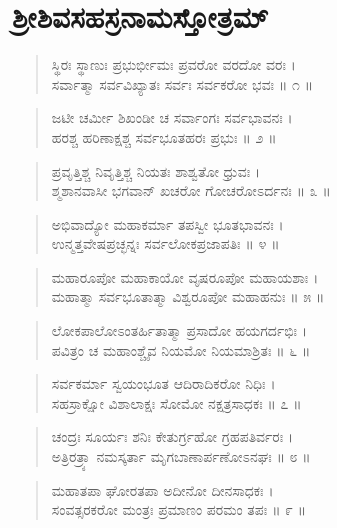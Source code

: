 
\chapter{ಶ್ರೀಶಿವಸಹಸ್ರನಾಮಸ್ತೋತ್ರಮ್}

\begin{verse}
ಸ್ಥಿರಃ ಸ್ಥಾಣುಃ ಪ್ರಭುರ್ಭೀಮಃ ಪ್ರವರೋ ವರದೋ ವರಃ ।\\ಸರ್ವಾತ್ಮಾ ಸರ್ವವಿಖ್ಯಾತಃ ಸರ್ವಃ ಸರ್ವಕರೋ ಭವಃ \num{॥ ೧ ॥}
\end{verse}

\begin{verse}
ಜಟೀ ಚರ್ಮೀ ಶಿಖಂಡೀ ಚ ಸರ್ವಾಂಗಃ ಸರ್ವಭಾವನಃ ।\\ಹರಶ್ಚ ಹರಿಣಾಕ್ಷಶ್ಚ ಸರ್ವಭೂತಹರಃ ಪ್ರಭುಃ \num{॥ ೨ ॥}
\end{verse}

\begin{verse}
ಪ್ರವೃತ್ತಿಶ್ಚ ನಿವೃತ್ತಿಶ್ಚ ನಿಯತಃ ಶಾಶ್ವತೋ ಧ್ರುವಃ ।\\ಶ್ಮಶಾನವಾಸೀ ಭಗವಾನ್ ಖಚರೋ ಗೋಚರೋಽರ್ದನಃ \num{॥ ೩ ॥}
\end{verse}

\begin{verse}
ಅಭಿವಾದ್ಯೋ ಮಹಾಕರ್ಮಾ ತಪಸ್ವೀ ಭೂತಭಾವನಃ ।\\ಉನ್ಮತ್ತವೇಷಪ್ರಚ್ಛನ್ನಃ ಸರ್ವಲೋಕಪ್ರಜಾಪತಿಃ \num{॥ ೪ ॥}
\end{verse}

\begin{verse}
ಮಹಾರೂಪೋ ಮಹಾಕಾಯೋ ವೃಷರೂಪೋ ಮಹಾಯಶಾಃ ।\\ಮಹಾತ್ಮಾ ಸರ್ವಭೂತಾತ್ಮಾ ವಿಶ್ವರೂಪೋ ಮಹಾಹನುಃ \num{॥ ೫ ॥}
\end{verse}

\begin{verse}
ಲೋಕಪಾಲೋಽಂತರ್ಹಿತಾತ್ಮಾ ಪ್ರಸಾದೋ ಹಯಗರ್ದಭಿಃ ।\\ಪವಿತ್ರಂ ಚ ಮಹಾಂಶ್ಚೈವ ನಿಯಮೋ ನಿಯಮಾಶ್ರಿತಃ \num{॥ ೬ ॥}
\end{verse}

\begin{verse}
ಸರ್ವಕರ್ಮಾ ಸ್ವಯಂಭೂತ ಆದಿರಾದಿಕರೋ ನಿಧಿಃ ।\\ಸಹಸ್ರಾಕ್ಷೋ ವಿಶಾಲಾಕ್ಷಃ ಸೋಮೋ ನಕ್ಷತ್ರಸಾಧಕಃ \num{॥ ೭ ॥}
\end{verse}

\begin{verse}
ಚಂದ್ರಃ ಸೂರ್ಯಃ ಶನಿಃ ಕೇತುರ್ಗ್ರಹೋ ಗ್ರಹಪತಿರ್ವರಃ ।\\ಅತ್ರಿರತ್ರ್ಯಾ ನಮಸ್ಕರ್ತಾ ಮೃಗಬಾಣಾರ್ಪಣೋಽನಘಃ \num{॥ ೮ ॥}
\end{verse}

\begin{verse}
ಮಹಾತಪಾ ಘೋರತಪಾ ಅದೀನೋ ದೀನಸಾಧಕಃ ।\\ಸಂವತ್ಸರಕರೋ ಮಂತ್ರಃ ಪ್ರಮಾಣಂ ಪರಮಂ ತಪಃ \num{॥ ೯ ॥}
\end{verse}

